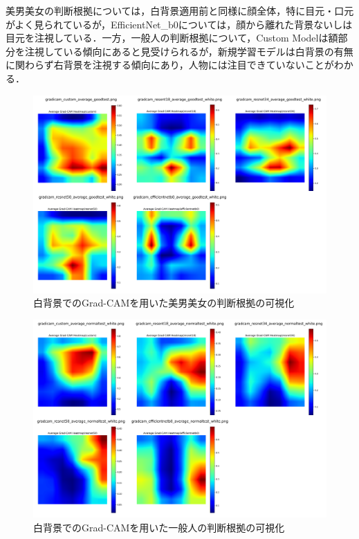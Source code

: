 \documentclass[a4paper,11pt,titlepage]{jsarticle}
\begin{document}
美男美女の判断根拠については，白背景適用前と同様に顔全体，特に目元・口元がよく見られているが，EfficientNet\_b0については，顔から離れた背景ないしは目元を注視している．一方，一般人の判断根拠について，Custom Modelは額部分を注視している傾向にあると見受けられるが，新規学習モデルは白背景の有無に関わらず右背景を注視する傾向にあり，人物には注目できていないことがわかる．

\begin{figure}[htbp]
    \centering
    \includegraphics[width=1.0\textwidth]{white_combined_images_good.png}
    \caption{白背景でのGrad-CAMを用いた美男美女の判断根拠の可視化}
    \label{fig:gradcam_good_white}
\end{figure}
\begin{figure}[htbp]
    \centering
    \includegraphics[width=1.0\textwidth]{white_combined_images_normal.png}
    \caption{白背景でのGrad-CAMを用いた一般人の判断根拠の可視化}
    \label{fig:gradcam_normal_white}
\end{figure}
\end{document}
